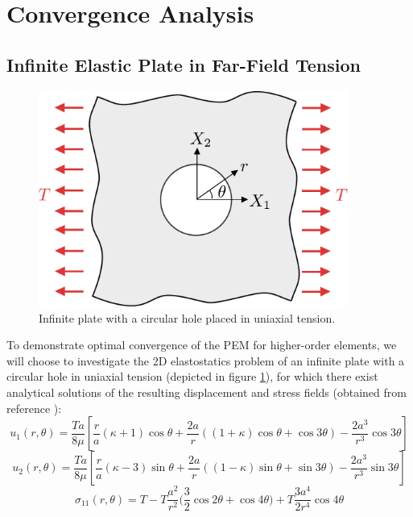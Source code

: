 \section{Convergence Analysis}

\subsection*{Infinite Elastic Plate in Far-Field Tension}

\begin{figure}[!h]
  \centering
  \includegraphics[width=4.0in]{figures/plate_with_hole.pdf}  \caption{Infinite plate with a circular hole placed in uniaxial tension.}
  \label{fig:plate_with_hole_problem}
\end{figure}
To demonstrate optimal convergence of the PEM for higher-order elements, we will choose to investigate the 2D elastostatics problem of an infinite plate with a circular hole in uniaxial tension (depicted in figure \ref{fig:plate_with_hole_problem}), for which there exist analytical solutions of the resulting displacement and stress fields (obtained from reference \cite{Wikiversity:17}):
\begin{equation}
  u_1 (r,\theta) = \frac{Ta}{8\mu} \left[ \frac{r}{a} (\kappa + 1) \cos \theta + \frac{2a}{r} ((1+\kappa) \cos \theta + \cos 3 \theta) - \frac{2a^3}{r^3} \cos 3 \theta \right]
\end{equation}
\begin{equation}
  u_2 (r,\theta) = \frac{Ta}{8\mu} \left[ \frac{r}{a} (\kappa - 3) \sin \theta + \frac{2a}{r} ((1-\kappa) \sin \theta + \sin 3 \theta) - \frac{2a^3}{r^3} \sin 3 \theta \right]
\end{equation}
\begin{equation}
  \sigma_{11} (r, \theta) = T - T \frac{a^2}{r^2} \bigg( \frac{3}{2} \cos 2 \theta + \cos 4 \theta \bigg) + T \frac{3a^4}{2r^4} \cos 4 \theta
\end{equation}

